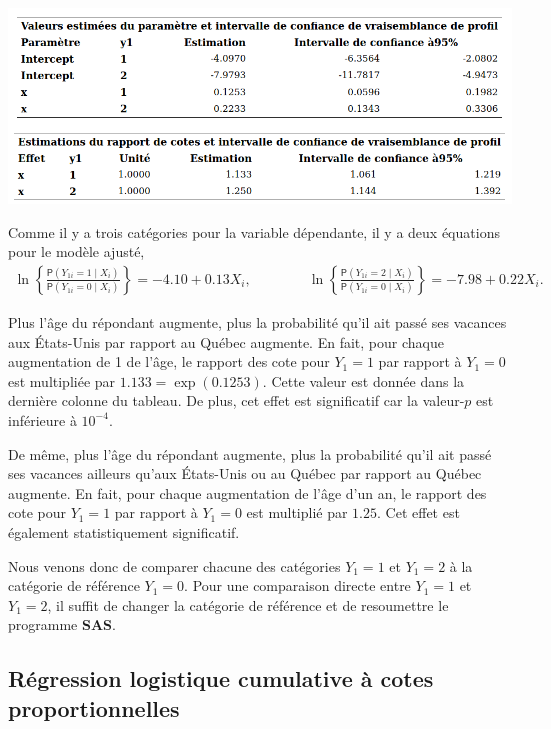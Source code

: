 \documentclass[
  11pt,
  letterpaper,
]{book}
\theoremstyle{definition}
\theoremstyle{definition}
\theoremstyle{definition}
\theoremstyle{remark}
\begin{document}
\begin{center}\includegraphics[width=0.82\linewidth]{figures/03-logistic-e25} \end{center}

Comme il y a trois catégories pour la variable dépendante, il y a deux équations pour le modèle ajusté,
\begin{align*}
\ln \left\{\frac{{\mathsf P}\left(Y_{1i}=1 \mid X_i\right)}{{\mathsf P}\left(Y_{1i}=0 \mid X_i\right)} \right\} = -4.10 + 0.13X_i, \qquad \qquad \ln \left\{\frac{{\mathsf P}\left(Y_{1i}=2 \mid X_i\right)}{{\mathsf P}\left(Y_{1i}=0 \mid X_i\right)} \right\} = -7.98+0.22X_i. 
\end{align*}

Plus l'âge du répondant augmente, plus la probabilité qu'il ait passé ses vacances aux États-Unis par rapport au Québec augmente. En fait, pour chaque augmentation de 1 de l'âge, le rapport des cote pour \(Y_1=1\) par rapport à \(Y_1=0\) est multipliée par \({1.133}=\exp({0.1253})\). Cette valeur est donnée dans la dernière colonne du tableau. De plus, cet effet est significatif car la valeur-\(p\) est inférieure à \(10^{-4}\).

De même, plus l'âge du répondant augmente, plus la probabilité qu'il ait passé ses vacances ailleurs qu'aux États-Unis ou au Québec par rapport au Québec augmente. En fait, pour chaque augmentation de l'âge d'un an, le rapport des cote pour \(Y_1=1\) par rapport à \(Y_1=0\) est multiplié par \({1.25}\). Cet effet est également statistiquement significatif.

Nous venons donc de comparer chacune des catégories \(Y_1=1\) et \(Y_1=2\) à la catégorie de référence \(Y_1=0\). Pour une comparaison directe entre \(Y_1=1\) et \(Y_1=2\), il suffit de changer la catégorie de référence et de resoumettre le programme \textbf{SAS}.

\hypertarget{ruxe9gression-logistique-cumulative-uxe0-cotes-proportionnelles}{%
\subsection{Régression logistique cumulative à cotes proportionnelles}\label{ruxe9gression-logistique-cumulative-uxe0-cotes-proportionnelles}}
\end{document}
